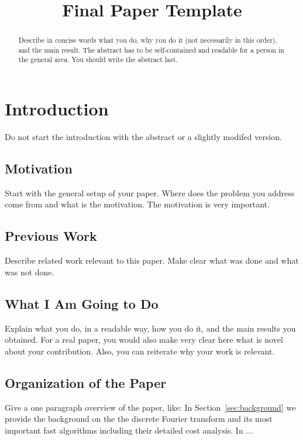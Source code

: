 \documentclass{article}
\title{Final Paper Template}
\begin{document}
%
\maketitle
%
\begin{abstract}
Describe in concise words what you do, why you do it (not necessarily
in this order), and the main result.  The abstract has to be
self-contained and readable for a person in the general area. You
should write the abstract last.
\end{abstract}

\section{Introduction}\label{sec:intro}

Do not start the introduction with the abstract or a slightly modifed
version.

\subsection{Motivation}

Start with the general setup of your paper. Where does the problem you
address come from and what is the motivation. The motivation is very
important.

\subsection{Previous Work}

Describe related work relevant to this paper. Make clear what was
done and what was not done.

\subsection{What I Am Going to Do}

Explain what you do, in a readable way, how you do it, and the main
results you obtained. For a real paper, you would also make very clear
here what is novel about your contribution. Also, you can reiterate
why your work is relevant.

\subsection{Organization of the Paper}

Give a one paragraph overview of the paper, like: In
Section~\ref{sec:background} we provide the background on the the
discrete Fourier transform and its most important fast algorithms
including their detailed cost analysis. In ...
\end{document}
